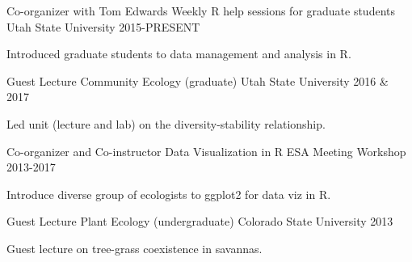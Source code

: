 

\begin{cventries}

  \cventry
    {Co-organizer with Tom Edwards} %
    {Weekly R help sessions for graduate students} %
    {Utah State University} %
    {2015-PRESENT} %
    {
      \begin{cvitems} %
        \item {Introduced graduate students to data management and analysis in R.}
      \end{cvitems}
    }

  \cventry
    {Guest Lecture} %
    {Community Ecology (graduate)} %
    {Utah State University} %
    {2016 \& 2017} %
    {
      \begin{cvitems} %
        \item {Led unit (lecture and lab) on the diversity-stability relationship.}
      \end{cvitems}
    }

  \cventry
    {Co-organizer and Co-instructor} %
    {Data Visualization in R} %
    {ESA Meeting Workshop} %
    {2013-2017} %
    {
      \begin{cvitems} %
        \item {Introduce diverse group of ecologists to ggplot2 for data viz in R.}
      \end{cvitems}
    }

  \cventry
    {Guest Lecture} %
    {Plant Ecology (undergraduate)} %
    {Colorado State University} %
    {2013} %
    {
      \begin{cvitems} %
        \item {Guest lecture on tree-grass coexistence in savannas.}
      \end{cvitems}
    }


\end{cventries}
